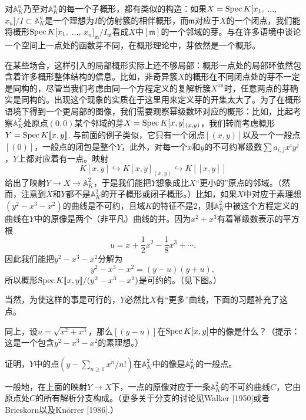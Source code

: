对$\mathbb{A}_K^n$乃至对$\mathbb{A}_K^n$的每一个子概形，都有类似的构造：如果$X=\operatorname{Spec} K[x_1,$ $\dots$, $x_n]/I\subset \mathbb{A}_K^n$是一个理想为$I$的仿射簇的相伴概形，而$\mathfrak{m}$对应于$X$的一个闭点，我们能将概形$\operatorname{Spec} K[x_1,$ $\dots$, $x_n]_\mathfrak{m}/I_{\mathfrak{m}}$看成$X$中$[\mathfrak{m}]$的一个邻域的芽。与在许多语境中谈论一个空间上一点处的函数芽不同，在概形理论中，芽依然是一个概形。

在某些场合，这样引入的局部概形实际上还不够局部：概形一点处的局部环依然包含着许多概形整体结构的信息。比如，非奇异簇$X$的概形在不同闭点处的芽不一定是同构的，尽管当我们考虑由同一个方程定义的复解析簇$X^{\text{an}}$时，任意两点的芽确实是同构的。出现这个现象的实质在于这里用来定义芽的开集太大了。为了在概形语境下得到一个更局部的图像，我们需要观察幂级数环对应的概形：比如，比起考察$\mathbb{A}_K^2$处原点$(0,0)$某个邻域的芽$X=\operatorname{Spec} K[x,y]_{(x,y)}$，我们转而考虑概形$Y=\operatorname{Spec} K [\![x,y]\!]$. 与前面的例子类似，它只有一个闭点$[(x,y)]$以及一个一般点$[(0)]$，一般点的闭包是整个$Y$，此外，对每一个$x$和$y$的不可约幂级数$\sum a_{i,j}x^iy^j$，$Y$上都对应着有一点。映射 %
\[
	K[x,y]\hookrightarrow K[x,y]_{(x,y)}\hookrightarrow K[\![x,y]\!]
\]
给出了映射$Y\to X\to \mathbb{A}_K^2$，于是我们能把$Y$想象成比$X$“更小的”原点的邻域。（然而，注意到$X$和$Y$都不是$\mathbb{A}_K^2$的开子概形或闭子概形。）比如，如果$X$中对应于素理想$(y^2-x^3-x^2)$的曲线是不可约，且域$K$的特征不是$2$，则$\mathbb{A}_K^2$中被这个方程定义的曲线在$Y$中的原像是两个（非平凡）曲线的并。因为$x^2+x^3$有着幂级数表示的平方根
\[
	u=x+\frac{1}{2}x^2-\frac{1}{8}x^3+\cdots.
\]
因此我们能把$y^2-x^3-x^2$分解为
\[
	y^2-x^3-x^2=(y-u)(y+u),
\]
所以概形$\operatorname{Spec}  K[\![x,y]\!]/(y^2-x^3-x^2)$是可约的。（见下图。）


当然，为使这样的事是可行的，$Y$必然比$X$有“更多”曲线，下面的习题补充了这点。

\begin{exe}
	\begin{compactenum}[(a)]
		\item 同上，设$u=\sqrt{x^2+x^3}$，那么$[(y-u)]$在$\operatorname{Spec} K[x,y]$中的像是什么？（提示：这是一个包含$y^2-x^3-x^2$的素理想。）
		\item 证明，$Y$中的点$(y-\sum_{n\geq 1}x^n/n!)$在$\mathbb{A}_K^2$中的像是$\mathbb{A}_K^2$的一般点。
	\end{compactenum}
\end{exe}

一般地，在上面的映射$Y\to X$下，一点的原像对应于一条$\mathbb{A}_K^2$的不可约曲线$C$，它由原点处$C$的所有解析分支构成。（更多关于分支的讨论见Walker [1950]或者Brieskorn以及Kn\"{o}rrer [1986].）

